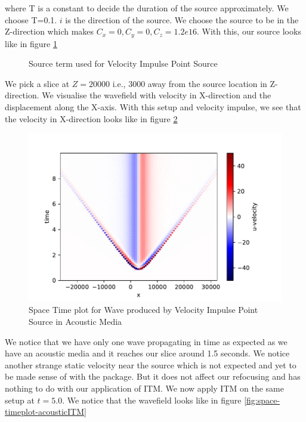 where T is a constant to decide the duration of the source approximately. We choose T=0.1. $i$ is the direction of the source. 
We choose the source to be in the Z-direction which makes $C_x = 0, C_y = 0, C_z = 1.2e16$. With this, our source looks like in figure \ref{fig:source}

\begin{figure}
    \centering
    \caption{Source term used for Velocity Impulse Point Source}
    \label{fig:source}
\end{figure}

We pick a slice at $Z=20000$ i.e., 3000 away from the source location in Z-direction.
We visualise the wavefield with velocity in X-direction and the displacement along the X-axis. With this setup and velocity impulse, we see that the velocity in X-direction
looks like in figure \ref{fig:space-timeplot-acousticnoITM}

\begin{figure}
    \centering
    \includegraphics[width=0.75\linewidth]{figures/Acoustic-noITM.pdf}
    \caption{Space Time plot for Wave produced by Velocity Impulse Point Source in Acoustic Media}
    \label{fig:space-timeplot-acousticnoITM}
\end{figure}

We notice that we have only one wave propagating in time as expected as we have an acoustic media and it reaches our slice around 1.5 seconds. We notice another 
strange static velocity near the source which is not expected and yet to be made sense of with the package. But it does not affect our refocusing and has nothing to do with
our application of \ac{ITM}. We now apply ITM on the same setup at $t=5.0$. We notice that the wavefield looks like in figure \ref{fig:space-timeplot-acousticITM}

